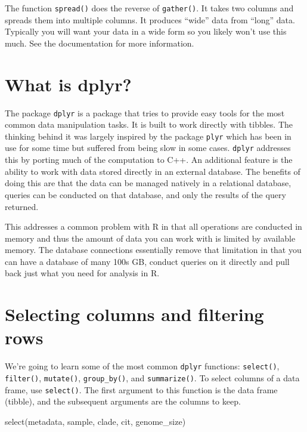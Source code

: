 \documentclass[
]{book}
\newenvironment{Shaded}{\begin{snugshade}}{\end{snugshade}}
\newcommand{\FunctionTok}[1]{\textcolor[rgb]{0.00,0.00,0.00}{#1}}
\newcommand{\NormalTok}[1]{#1}
\begin{document}
The function \texttt{spread()} does the reverse of \texttt{gather()}. It takes two columns and spreads them into multiple columns. It produces ``wide'' data from ``long'' data. Typically you will want your data in a wide form so you likely won't use this much. See the documentation for more information.

\hypertarget{what-is-dplyr}{%
\section{What is dplyr?}\label{what-is-dplyr}}

The package \texttt{dplyr} is a package that tries to provide easy tools for the most common data manipulation tasks. It is built to work directly with tibbles. The thinking behind it was largely inspired by the package \texttt{plyr} which has been in use for some time but suffered from being slow in some cases. \texttt{dplyr} addresses this by porting much of the computation to C++. An additional feature is the ability to work with data stored directly in an external database. The benefits of doing this are that the data can be managed natively in a relational database, queries can be conducted on that database, and only the results of the query returned.

This addresses a common problem with R in that all operations are conducted in memory and thus the amount of data you can work with is limited by available memory. The database connections essentially remove that limitation in that you can have a database of many 100s GB, conduct queries on it directly and pull back just what you need for analysis in R.

\hypertarget{selecting-columns-and-filtering-rows}{%
\section{Selecting columns and filtering rows}\label{selecting-columns-and-filtering-rows}}

We're going to learn some of the most common \texttt{dplyr} functions: \texttt{select()}, \texttt{filter()}, \texttt{mutate()}, \texttt{group\_by()}, and \texttt{summarize()}. To select columns of a data frame, use \texttt{select()}. The first argument to this function is the data frame (tibble), and the subsequent arguments are the columns to keep.

\begin{Shaded}
\begin{Highlighting}[]
\FunctionTok{select}\NormalTok{(metadata, sample, clade, cit, genome\_size)}
\end{Highlighting}
\end{Shaded}
\end{document}
